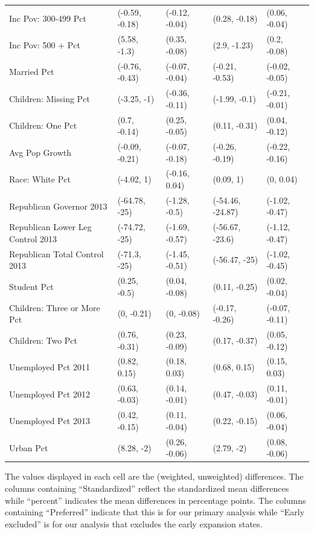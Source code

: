 \begin{landscape}
\begin{table}[h!]
\begin{threeparttable}
\begin{tabular}{lllll}
  Inc Pov: 300-499 Pct & (-0.59, -0.18) & (-0.12, -0.04) & (0.28, -0.18) & (0.06, -0.04) \\ 
  Inc Pov: 500 + Pct & (5.58, -1.3) & (0.35, -0.08) & (2.9, -1.23) & (0.2, -0.08) \\ 
  Married Pct & (-0.76, -0.43) & (-0.07, -0.04) & (-0.21, -0.53) & (-0.02, -0.05) \\ 
  Children: Missing Pct & (-3.25, -1) & (-0.36, -0.11) & (-1.99, -0.1) & (-0.21, -0.01) \\ 
  Children: One Pct & (0.7, -0.14) & (0.25, -0.05) & (0.11, -0.31) & (0.04, -0.12) \\ 
  Avg Pop Growth & (-0.09, -0.21) & (-0.07, -0.18) & (-0.26, -0.19) & (-0.22, -0.16) \\ 
  Race: White Pct & (-4.02, 1) & (-0.16, 0.04) & (0.09, 1) & (0, 0.04) \\ 
  Republican Governor 2013 & (-64.78, -25) & (-1.28, -0.5) & (-54.46, -24.87) & (-1.02, -0.47) \\ 
  Republican Lower Leg Control 2013 & (-74.72, -25) & (-1.69, -0.57) & (-56.67, -23.6) & (-1.12, -0.47) \\ 
  Republican Total Control 2013 & (-71.3, -25) & (-1.45, -0.51) & (-56.47, -25) & (-1.02, -0.45) \\ 
  Student Pct & (0.25, -0.5) & (0.04, -0.08) & (0.11, -0.25) & (0.02, -0.04) \\ 
  Children: Three or More Pct & (0, -0.21) & (0, -0.08) & (-0.17, -0.26) & (-0.07, -0.11) \\ 
  Children: Two Pct & (0.76, -0.31) & (0.23, -0.09) & (0.17, -0.37) & (0.05, -0.12) \\ 
  Unemployed Pct 2011 & (0.82, 0.15) & (0.18, 0.03) & (0.68, 0.15) & (0.15, 0.03) \\ 
  Unemployed Pct 2012 & (0.63, -0.03) & (0.14, -0.01) & (0.47, -0.03) & (0.11, -0.01) \\ 
  Unemployed Pct 2013 & (0.42, -0.15) & (0.11, -0.04) & (0.22, -0.15) & (0.06, -0.04) \\ 
  Urban Pct & (8.28, -2) & (0.26, -0.06) & (2.79, -2) & (0.08, -0.06) \\ 
   \hline
\end{tabular}
    \begin{tablenotes}
      \item[] The values displayed in each cell are the (weighted, unweighted) differences. The columns containing ``Standardized'' reflect the standardized mean differences while ``percent'' indicates the mean differences in percentage points. The columns containing ``Preferred'' indicate that this is for our primary analysis while ``Early excluded'' is for our analysis that excludes the early expansion states.
    \end{tablenotes}
\end{threeparttable}
\end{table}


\end{landscape}
